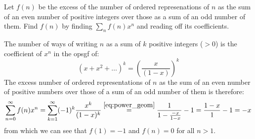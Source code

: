 \begin{exercise}
    Let $f(n)$ be the excess of the number of ordered represenations of $n$ as the sum of an even number of positive integers over those as a sum of an odd number of them. Find $f(n)$ by finding $\sum_n f(n)x^n$ and reading off its coefficients.
\end{exercise}
\begin{solution}
    The number of ways of writing $n$ as a sum of $k$ positive integers ($> 0$) is the coefficient of $x^n$ in the opsgf of:
    \[
        (x + x^2 + \ldots )^k = \left(\frac{x}{(1-x)}\right)^k
    \]
    The excess number of ordered representations of $n$ as the sum of an even number of positive numbers over those of a sum of an odd number of them is therefore:
    \[
        \sum_{n=0}^\infty f(n) x^n = \sum_{k=1}^\infty (-1)^k \frac{x^k}{(1-x)^k} \overset{\eqref{eq:power_geom}}{=} \frac{1}{1 - \frac{-x}{1-x}} - 1 = \frac{1-x}{1} - 1 = -x
    \]
    from which we can see that $f(1) = -1$ and $f(n) = 0$ for all $n > 1$.
\end{solution}

